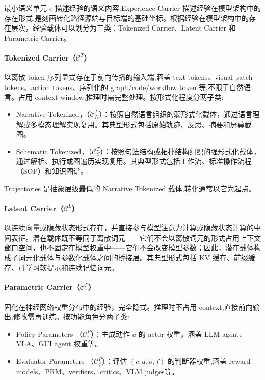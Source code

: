 最小语义单元 $e$ 描述经验的语义内容;Experience Carrier 描述经验在模型架构中的存在形式,是刻画转化路径源端与目标端的基础坐标。根据经验在模型架构中的存在层次，经验载体可以划分为三类：Tokenized Carrier、Latent Carrier 和 Parametric Carrier。

\paragraph{Tokenized Carrier（$\mathcal{C}^T$）} 以离散 token 序列显式存在于前向传播的输入端,涵盖 text tokens、visual patch tokens、action tokens、序列化的 graph/code/workflow token 等,不限于自然语言。占用 context window,推理时需完整处理。按形式化程度分两子类:
\begin{itemize}
  \item Narrative Tokenized，（$\mathcal{C}^T_N$）：按照自然语言组织的弱形式化载体，通过语言理解或多模态理解实现复用。其典型形式包括原始轨迹、反思、摘要和屏幕截图。
  \item Schematic Tokenized，（$\mathcal{C}^T_S$）：按照句法结构或拓扑结构组织的强形式化载体，通过解析、执行或图遍历实现复用。其典型形式包括工作流、标准操作流程（SOP）和知识图谱。
\end{itemize}

Trajectories 是抽象层级最低的 Narrative Tokenized 载体,转化通常以它为起点。

\paragraph{Latent Carrier（$\mathcal{C}^L$）} 以连续向量或隐藏状态形式存在，并直接参与模型注意力计算或隐藏状态计算的中间表征。潜在载体既不等同于离散词元——它们不会以离散词元的形式占用上下文窗口空间，也不固定在模型权重中——它们不会改变模型参数；因此，潜在载体构成了词元化载体与参数化载体之间的桥接层。其典型形式包括 KV 缓存、前缀缓存、可学习软提示和连续记忆词元。

\paragraph{Parametric Carrier（$\mathcal{C}^P$）} 固化在神经网络权重分布中的经验，完全隐式。推理时不占用 context,直接前向输出,修改需再训练。按功能角色分两子类:
\begin{itemize}
  \item Policy Parameters （$\mathcal{C}^P_\pi$）：生成动作 $a$ 的 actor 权重，涵盖 LLM agent、VLA、GUI agent 权重等。
  \item Evaluator Parameters （$\mathcal{C}^P_\phi$）：评估 $(c,a,o,f)$ 的判断器权重,涵盖 reward models、PRM、verifiers、critics、VLM judges等。
\end{itemize}

